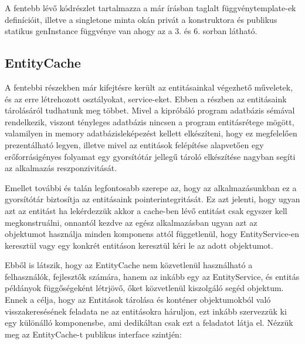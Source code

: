 A fentebb lévő kódrészlet tartalmazza a már írásban taglalt függvénytemplate-ek definícióit, illetve a singletone minta okán privát a konstruktora és publikus statikus genInstance függvénye van ahogy az a 3. és 6. sorban látható.

\subsection{EntityCache}

A fentebbi részekben már kifejtésre került az entitásainkal végezhető műveletek, és az erre létrehozott osztályokat, service-eket. Ebben a részben az entitásaink tárolásáról tudhatunk meg többet. Mivel a kipróbáló program adatbázis sémával rendelkezik, viszont tényleges adatbázis nincsen a program entitásrétege mögött, valamilyen in memory adatbázisleképezést kellett elkészíteni, hogy ez megfelelően prezentálható legyen, illetve mivel az entitások felépítése alapvetően egy erőforrásigényes folyamat egy gyorsítótár jellegű tároló elkészítése nagyban segíti az alkalmazás reszponzivitását. 

Emellet további és talán legfontosabb szerepe az, hogy az alkalmazásunkban ez a gyorsítótár biztosítja az entitásaink pointerintegritását. Ez azt jelenti, hogy ugyan azt az entitást ha lekérdezzük akkor a cache-ben lévő entitást csak egyszer kell megkonstruálni, onnantól kezdve az egész alkalmazásban ugyan azt az objektumot használja minden komponens attól függetlenül, hogy EntityService-en keresztül vagy egy konkrét entitáson keresztül kéri le az adott objektumot.

Ebből is látszik, hogy az EntityCache nem közvetlenül használható a felhasználók, fejlesztők számára, hanem az inkább egy az EntityService, és entitás példányok függőségeként létrjövő, őket közvetlenül kiszolgáló segéd objektum. Ennek a célja, hogy az Entitások tárolása és konténer objektumokból való visszakeresésének feladata ne az entitásokra háruljon, ezt inkább szervezzük ki egy különálló komponensbe, ami dedikáltan csak ezt a feladatot látja el. Nézzük meg az EntityCache-t publikus interface szintjén:

